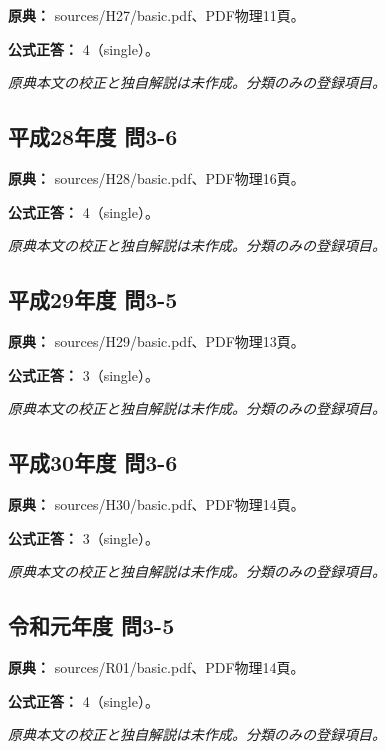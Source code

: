 \noindent\textbf{原典：} sources/H27/basic.pdf、PDF物理11頁。

\textbf{公式正答：} 4（single）。

\par\textit{原典本文の校正と独自解説は未作成。分類のみの登録項目。}

\subsection{平成28年度 問3-6}
\label{q:h28-reg-basic-3-6}

\noindent\textbf{原典：} sources/H28/basic.pdf、PDF物理16頁。

\textbf{公式正答：} 4（single）。

\par\textit{原典本文の校正と独自解説は未作成。分類のみの登録項目。}

\subsection{平成29年度 問3-5}
\label{q:h29-reg-basic-3-5}

\noindent\textbf{原典：} sources/H29/basic.pdf、PDF物理13頁。

\textbf{公式正答：} 3（single）。

\par\textit{原典本文の校正と独自解説は未作成。分類のみの登録項目。}

\subsection{平成30年度 問3-6}
\label{q:h30-reg-basic-3-6}

\noindent\textbf{原典：} sources/H30/basic.pdf、PDF物理14頁。

\textbf{公式正答：} 3（single）。

\par\textit{原典本文の校正と独自解説は未作成。分類のみの登録項目。}

\subsection{令和元年度 問3-5}
\label{q:r01-reg-basic-3-5}

\noindent\textbf{原典：} sources/R01/basic.pdf、PDF物理14頁。

\textbf{公式正答：} 4（single）。

\par\textit{原典本文の校正と独自解説は未作成。分類のみの登録項目。}

